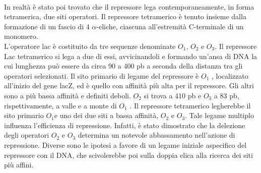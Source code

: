 \documentclass{article}
\begin{document}
\paragraph{}
In realtà è stato poi trovato che il repressore lega contemporaneamente,
in forma tetramerica, due siti operatori. Il repressore tetramerico è tenuto insieme
dalla formazione di un fascio di 4 $\alpha$-eliche, ciascuna all'estremità C-terminale di un
monomero.\\
L'operatore lac è costituito da tre sequenze denominate $O_{1}$, $O_{2}$ e $O_{3}$. Il repressore Lac tetramerico si
lega a due di essi, avvicinandoli e formando un'ansa di DNA la cui lunghezza può
essere da circa 90 a 400 pb a seconda della distanza tra gli operatori selezionati. Il
sito primario di legame del repressore è $O_{1}$ , localizzato all'inizio del gene lacZ, ed
è quello con affinità più alta per il repressore. Gli altri sono a più bassa affinità e
definiti deboli. $O_{2}$  si trova a 410 pb e $O_{3}$  a 83 pb, rispettivamente, a valle e a monte
di $O_{1}$ . Il repressore tetramerico legherebbe il sito primario $O_{1}$e uno dei due siti a
bassa affinità, $O_{2}$ e $O_{3}$. Tale legame multiplo influenza l'efficienza di repressione.
Infatti, è stato dimostrato che la delezione degli operatori $O_{2}$  e $O_{3}$ determina un
notevole abbassamento nell'azione di repressione. Diverse sono le ipotesi a favore
di un legame iniziale aspecifico del repressore con il DNA, che scivolerebbe poi sulla doppia elica alla ricerca dei siti più affini.
\end{document}
